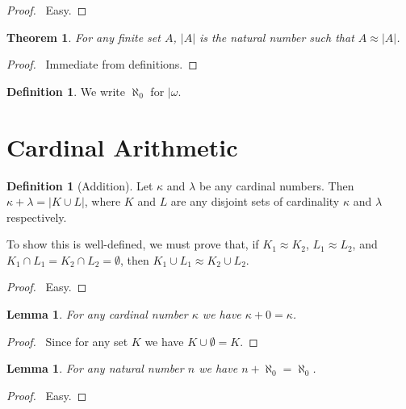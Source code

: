 \documentclass{article}
\let\qed\relax
\newtheorem{lemma}[axiom]{Lemma}
\newtheorem{theorem}[axiom]{Theorem}
\theoremstyle{definition}
\newtheorem{definition}[axiom]{Definition}
\begin{document}
    \begin{proof}
        \pf\ Easy. \qed
    \end{proof}

    \begin{theorem}
        For any finite set $A$, $|A|$ is the natural number such that $A \approx |A|$.
    \end{theorem}

    \begin{proof}
        \pf\ Immediate from definitions. \qed
    \end{proof}

    \begin{definition}
        We write $\aleph_0$ for $|\omega$.
    \end{definition}

    \section{Cardinal Arithmetic}

    \begin{definition}[Addition]
        Let $\kappa$ and $\lambda$ be any cardinal numbers. Then $\kappa + \lambda = |K \cup L|$,
        where $K$ and $L$ are any disjoint sets of cardinality $\kappa$ and $\lambda$ respectively.

        To show this is well-defined, we must prove that, if $K_1 \approx K_2$, $L_1 \approx L_2$,
        and $K_1 \cap L_1 = K_2 \cap L_2 = \emptyset$, then $K_1 \cup L_1 \approx K_2 \cup L_2$.
    \end{definition}

    \begin{proof}
        \pf\ Easy.
    \end{proof}

    \begin{lemma}
        For any cardinal number $\kappa$ we have $\kappa + 0 = \kappa$.
    \end{lemma}

    \begin{proof}
        \pf\ Since for any set $K$ we have $K \cup \emptyset = K$.
    \end{proof}

    \begin{lemma}
        For any natural number $n$ we have $n + \aleph_0 = \aleph_0$.
    \end{lemma}

    \begin{proof}
        \pf\ Easy. \qed
    \end{proof}
\end{document}
